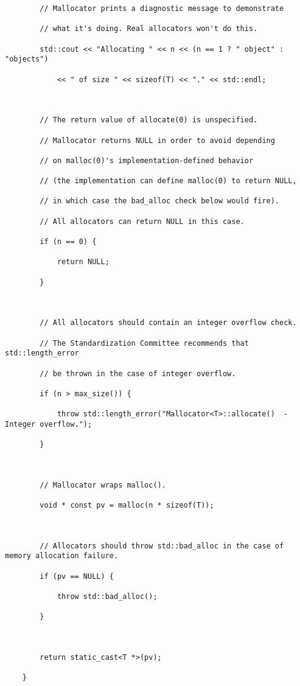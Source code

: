 {\begin{lstlisting}
        // Mallocator prints a diagnostic message to demonstrate

        // what it's doing. Real allocators won't do this.

        std::cout << "Allocating " << n << (n == 1 ? " object" : "objects")

            << " of size " << sizeof(T) << "." << std::endl;

 

        // The return value of allocate(0) is unspecified.

        // Mallocator returns NULL in order to avoid depending

        // on malloc(0)'s implementation-defined behavior

        // (the implementation can define malloc(0) to return NULL,

        // in which case the bad_alloc check below would fire).

        // All allocators can return NULL in this case.

        if (n == 0) {

            return NULL;

        }

 

        // All allocators should contain an integer overflow check.

        // The Standardization Committee recommends that std::length_error

        // be thrown in the case of integer overflow.

        if (n > max_size()) {

            throw std::length_error("Mallocator<T>::allocate()  -  Integer overflow.");

        }

 

        // Mallocator wraps malloc().

        void * const pv = malloc(n * sizeof(T));

 

        // Allocators should throw std::bad_alloc in the case of memory allocation failure.

        if (pv == NULL) {

            throw std::bad_alloc();

        }

 

        return static_cast<T *>(pv);

    }


\end{lstlisting}}
